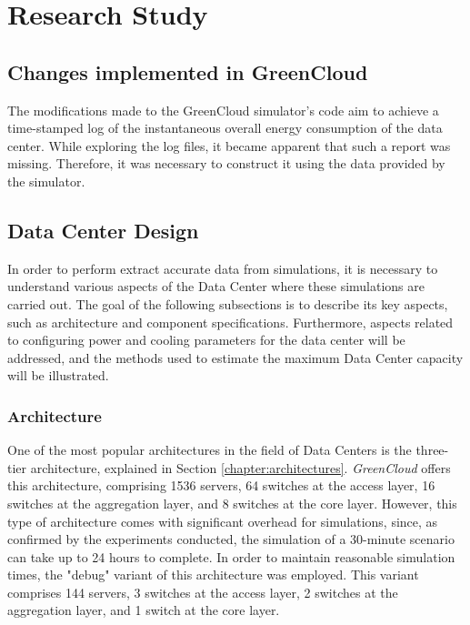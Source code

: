 \chapter{Research Study} \label{chapter:research_study}

\begin{citazione}

\end{citazione}
\newpage

\section{Changes implemented in GreenCloud}\label{section:greencloud_mod}
The modifications made to the GreenCloud simulator's code aim to achieve a time-stamped log of the instantaneous overall energy consumption of the data center. While exploring the log files, it became apparent that such a report was missing. Therefore, it was necessary to construct it using the data provided by the simulator.

\section{Data Center Design}
In order to perform extract accurate data from simulations, it is necessary to understand various aspects of the Data Center where these simulations are carried out. The goal of the following subsections is to describe its key aspects, such as architecture and component specifications. Furthermore, aspects related to configuring power and cooling parameters for the data center will be addressed, and the methods used to estimate the maximum Data Center capacity will be illustrated.

\subsection{Architecture}
One of the most popular architectures in the field of Data Centers is the three-tier architecture, explained in Section \ref{chapter:architectures}. \emph{GreenCloud} offers this architecture, comprising 1536 servers, 64 switches at the access layer, 16 switches at the aggregation layer, and 8 switches at the core layer. However, this type of architecture comes with significant overhead for simulations, since, as confirmed by the experiments conducted, the simulation of a 30-minute scenario can take up to 24 hours to complete. In order to maintain reasonable simulation times, the "debug" variant of this architecture was employed. This variant comprises 144 servers, 3 switches at the access layer, 2 switches at the aggregation layer, and 1 switch at the core layer. 

